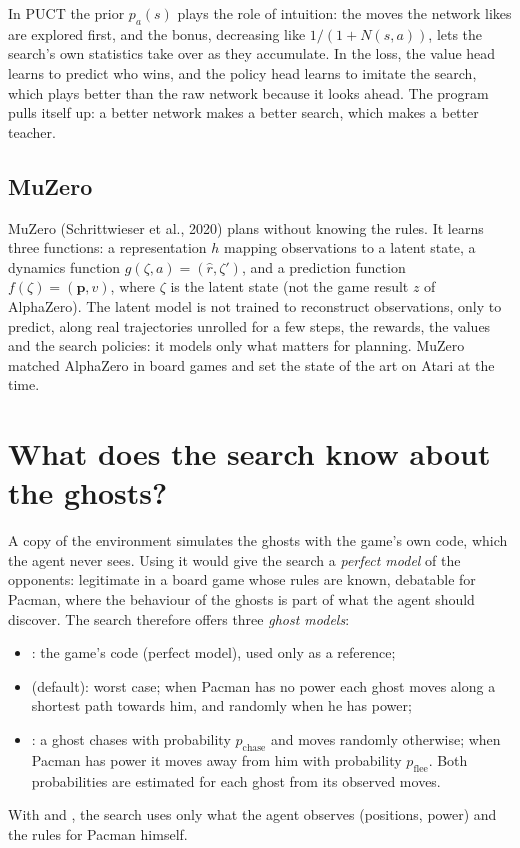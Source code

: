 \begin{intuition}
  In PUCT the prior $p_a(s)$ plays the role of intuition: the moves the
  network likes are explored first, and the bonus, decreasing like $1 /
  (1 + N(s, a))$, lets the search's own statistics take over as they
  accumulate. In the loss, the value head learns to predict who wins, and
  the policy head learns to imitate the search, which plays better than
  the raw network because it looks ahead. The program pulls itself up: a
  better network makes a better search, which makes a better teacher.
\end{intuition}

\subsection{MuZero}

MuZero (Schrittwieser et al., 2020) plans without knowing the rules. It
learns three functions: a representation $h$ mapping observations to a
latent state, a dynamics function $g(\zeta, a) = (\hat r, \zeta')$, and a
prediction function $f(\zeta) = (\mathbf{p}, v)$, where $\zeta$ is the
latent state (not the game result $z$ of AlphaZero). The latent model is not
trained to reconstruct observations, only to predict, along real trajectories
unrolled for a few steps, the rewards, the values and the search policies:
it models only what matters for planning. MuZero matched AlphaZero in board
games and set the state of the art on Atari at the time.

\section{What does the search know about the ghosts?}
\label{sec:ghost-models}

A copy of the environment simulates the ghosts with the game's own code,
which the agent never sees. Using it would give the search a \emph{perfect
model} of the opponents: legitimate in a board game whose rules are known,
debatable for Pacman, where the behaviour of the ghosts is part of what the
agent should discover. The search therefore offers three \emph{ghost
models}:
\begin{itemize}[nosep]
  \item {}: the game's code (perfect model), used only as a
    reference;
  \item {} (default): worst case; when Pacman has no power each
    ghost moves along a shortest path towards him, and randomly when he has
    power;
  \item {}: a ghost chases with probability $p_{\mathrm{chase}}$
    and moves randomly otherwise; when Pacman has power it moves away from
    him with probability $p_{\mathrm{flee}}$. Both probabilities are
    estimated for each ghost from its observed moves.
\end{itemize}
With  and , the search uses only what the agent
observes (positions, power) and the rules for Pacman himself.

